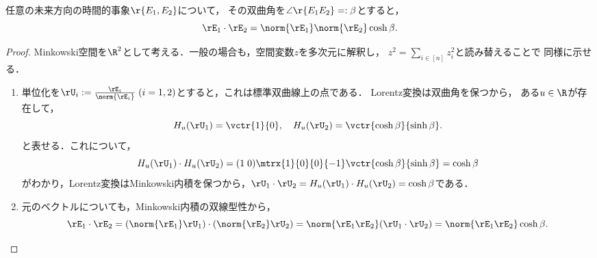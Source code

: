 \documentclass[uplatex,dvipdfmx]{jsarticle}
\begin{document}
\begin{theorem*}
    任意の未来方向の時間的事象$\r{E_1,E_2}$について，
    その双曲角を$\angle\r{E_1E_2}=:\beta$とすると，
    \[\rE_1\cdot\rE_2=\norm{\rE_1}\norm{\rE_2}\cosh\beta.\]
\end{theorem*}
\begin{proof}
    Minkowski空間を$\R^2$として考える．一般の場合も，空間変数$z$を多次元に解釈し，
    $z^2=\sum_{i\in[n]}z_i^2$と読み替えることで
    同様に示せる．
    \begin{enumerate}[{Step}1]
        \item 単位化を$\rU_i:=\frac{\rE_i}{\norm{\rE_i}}\;(i=1,2)$とすると，これは標準双曲線上の点である．
        Lorentz変換は双曲角を保つから，
        ある$u\in\R$が存在して，
        \[H_u(\rU_1)=\vctr{1}{0},\quad H_u(\rU_2)=\vctr{\cosh\beta}{\sinh\beta}.\]
        と表せる．これについて，
        \[H_u(\rU_1)\cdot H_u(\rU_2)=(1\;0)\mtrx{1}{0}{0}{-1}\vctr{\cosh\beta}{\sinh\beta}=\cosh\beta\]
        がわかり，Lorentz変換はMinkowski内積を保つから，$\rU_1\cdot \rU_2=H_u(\rU_1)\cdot H_u(\rU_2)=\cosh\beta$である．
        \item 元のベクトルについても，Minkowski内積の双線型性から，
        \[\rE_1\cdot\rE_2=(\norm{\rE_1}\rU_1)\cdot(\norm{\rE_2}\rU_2)=\norm{\rE_1\rE_2}(\rU_1\cdot \rU_2)=\norm{\rE_1\rE_2}\cosh\beta.\]
    \end{enumerate}
\end{proof}
\end{document}
